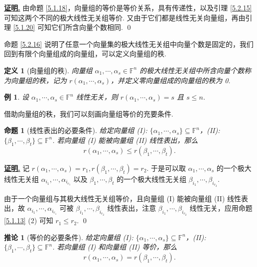\documentclass[10pt,openany]{article}
\theoremstyle{thmstyle} %
\theoremstyle{defstyle} %
\newtheorem{definition}[theorem]{定义}
\newtheorem{corollary}[theorem]{推论}
\theoremstyle{prostyle} %
\newtheorem{proposition}[theorem]{命题}
\theoremstyle{exastyle}
\newtheorem{example}[theorem]{例}
\theoremstyle{remstyle}
\renewenvironment{proof}[1][证明]{\par\underline{\textbf{#1.}} \;\fangsong}{\qed\par}
\newcommand{\F}{\mathbb{F}}
\begin{document}
\begin{proof}
	由命题 \ref{5.1.18}，向量组的等价是等价关系，具有传递性，以及引理 \ref{5.2.15} 可知这两个不同的极大线性无关组等价. 又由于它们都是线性无关向量组，再由引理 \ref{5.1.20} 可知它们所含向量个数相同.
\end{proof}


命题 \ref{5.2.16} 说明了任意一个向量集的极大线性无关组中向量个数是固定的，我们回到有限个向量组成的向量组，可以定义向量组的秩.

\begin{definition}[向量组的秩] \label{5.2.17}
	向量组 \( \alpha_1,\cdots,\alpha_s \in \F^n \) 的极大线性无关组中所含向量个数称为向量组的秩，记为 \( r(\alpha_1,\cdots,\alpha_s) \)，并定义零向量组成的向量组的秩为 0.
\end{definition}

\begin{example}
	设 \( \alpha_1,\cdots,\alpha_s \in \F^n \) 线性无关，则 \( r(\alpha_1,\cdots,\alpha_s)=s \) 且 \( s \leq n \).
\end{example}


借助向量组的秩，我们可以刻画向量组等价的充要条件.

\begin{proposition}[线性表出的必要条件] \label{5.2.19}
	给定向量组 (I): \( \{\alpha_1,\cdots,\alpha_s\} \subseteq \F^n \)，(II): \( \{\beta_1,\cdots,\beta_t\} \subseteq \F^n \). 若向量组 (I) 能被向量组 (II) 线性表出，那么
	\[ r(\alpha_1,\cdots,\alpha_s) \leq r(\beta_1,\cdots,\beta_t). \]
\end{proposition}


\begin{proof}
	记 \( r(\alpha_1,\cdots,\alpha_s)=r_1, r(\beta_1,\cdots,\beta_t)=r_2 \). 于是可以取 \( \alpha_1,\cdots,\alpha_s \) 的一个极大线性无关组 \( \alpha_{i_1},\cdots,\alpha_{i_{r_1}} \) 以及 \( \beta_1,\cdots,\beta_t \) 的一个极大线性无关组 \( \beta_{i_1},\cdots,\beta_{i_{r_2}} \).
	
	由于一个向量组与其极大线性无关组等价，且向量组 (I) 能被向量组 (II) 线性表出，故 \( \alpha_{i_1},\cdots,\alpha_{i_{r_1}} \) 可被 \(  \beta_{i_1},\cdots,\beta_{i_{r_2}} \) 线性表出，注意 \( \beta_{i_1},\cdots,\beta_{i_{r_2}} \) 线性无关，应用命题 \ref{5.1.13} (2) 可知 \( r_1 \leq r_2 \).
\end{proof}

\begin{corollary}[等价的必要条件] \label{5.2.20}
	给定向量组 (I): \( \{\alpha_1,\cdots,\alpha_s\} \subseteq \F^n \)，(II): \( \{\beta_1,\cdots,\beta_t\} \subseteq \F^n \). 若向量组 (I) 和向量组 (II) 等价，那么
	\[ r(\alpha_1,\cdots,\alpha_s) = r(\beta_1,\cdots,\beta_t). \]
\end{corollary}
\end{document}
